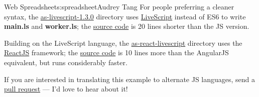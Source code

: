 \begin{aosachapter}{Web Spreadsheet}{s:spreadsheet}{Audrey Tang}
For people preferring a cleaner syntax, the
\href{https://audreyt.github.io/500lines/spreadsheet/as-livescript-1.3.0/}{as-livescript-1.3.0}
directory uses \href{http://livescript.net/}{LiveScript} instead of ES6
to write \textbf{main.ls} and \textbf{worker.ls}; the
\href{https://github.com/audreyt/500lines/tree/master/spreadsheet/as-livescript-1.3.0}{source
code} is 20 lines shorter than the JS version.

Building on the LiveScript language, the
\href{https://audreyt.github.io/500lines/spreadsheet/as-react-livescript/}{as-react-livescript}
directory uses the \href{https://facebook.github.io/react/}{ReactJS}
framework; the
\href{https://github.com/audreyt/500lines/tree/master/spreadsheet/as-react-livescript}{source
code} is 10 lines more than the AngularJS equivalent, but runs
considerably faster.

If you are interested in translating this example to alternate JS
languages, send a \href{https://github.com/audreyt/500lines/pulls}{pull
request} --- I'd love to hear about it!

\end{aosachapter}
